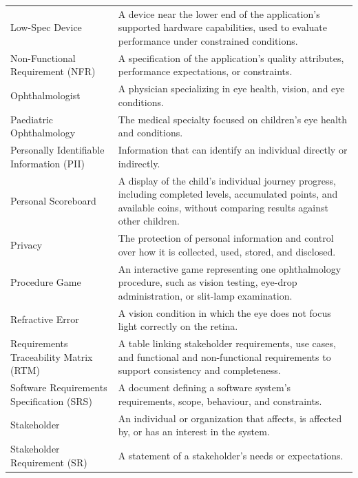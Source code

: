 \documentclass[12pt]{article}
\begin{document}
\begin{longtable}{@{}p{} p{}@{}}
Low-Spec Device &
A device near the lower end of the application's supported hardware capabilities, used to evaluate performance under constrained conditions. \\

Non-Functional Requirement (NFR) &
A specification of the application's quality attributes, performance expectations, or constraints. \\

Ophthalmologist &
A physician specializing in eye health, vision, and eye conditions. \\

Paediatric Ophthalmology &
The medical specialty focused on children's eye health and conditions. \\

Personally Identifiable Information (PII) &
Information that can identify an individual directly or indirectly. \\

Personal Scoreboard &
A display of the child's individual journey progress, including completed levels, accumulated points, and available coins, without comparing results against other children. \\

Privacy &
The protection of personal information and control over how it is collected, used, stored, and disclosed. \\

Procedure Game &
An interactive game representing one ophthalmology procedure, such as vision testing, eye-drop administration, or slit-lamp examination. \\

Refractive Error &
A vision condition in which the eye does not focus light correctly on the retina. \\

Requirements Traceability Matrix (RTM) &
A table linking stakeholder requirements, use cases, and functional and non-functional requirements to support consistency and completeness. \\

Software Requirements Specification (SRS) &
A document defining a software system's requirements, scope, behaviour, and constraints. \\

Stakeholder &
An individual or organization that affects, is affected by, or has an interest in the system. \\

Stakeholder Requirement (SR) &
A statement of a stakeholder's needs or expectations. \\


\end{longtable}
\end{document}
